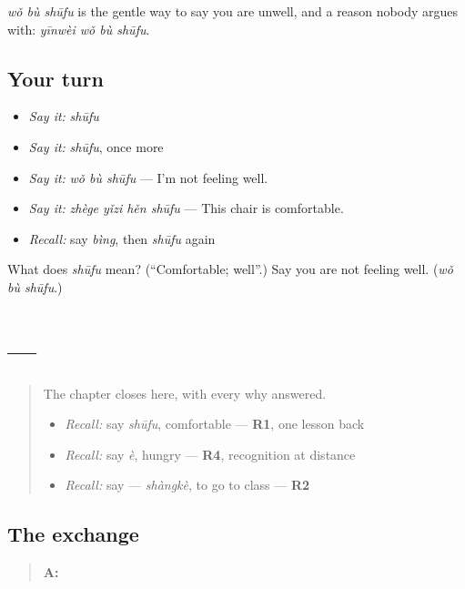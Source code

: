 \begin{grammarlens}[title={What you've built}]
\emph{wǒ bù shūfu} is the gentle way to say you are unwell, and a reason nobody argues with: \emph{yīnwèi wǒ bù shūfu}.
\end{grammarlens}

\subsection*{Your turn}
\begin{itemize}
\raggedright
  \item \emph{Say it:} \emph{shūfu}
  \item \emph{Say it:} \emph{shūfu}, once more
  \item \emph{Say it:} \emph{wǒ bù shūfu} — I'm not feeling well.
  \item \emph{Say it:} \emph{zhège yǐzi hěn shūfu} — This chair is comfortable.
  \item \emph{Recall:} say \emph{bìng}, then \emph{shūfu} again
\end{itemize}

\begin{tcolorbox}[breakable,colback=teal!4,colframe=teal!35!black,title={Before you move on}]
What does \emph{shūfu} mean? (\textquotedblleft{}Comfortable; well\textquotedblright{}.) Say you are not feeling well. (\emph{wǒ bù shūfu}.)
\end{tcolorbox}
\section[Practice]{ — }

\label{lesson:ZH-C96-practice}



\begin{quote}
The chapter closes here, with every why answered.

\begin{itemize}
\raggedright
  \item \emph{Recall:} say \emph{shūfu}, comfortable — \textbf{R1}, one lesson back
  \item \emph{Recall:} say \emph{è}, hungry — \textbf{R4}, recognition at distance
  \item \emph{Recall:} say  — \emph{shàngkè}, to go to class — \textbf{R2}
\end{itemize}
\end{quote}

\subsection*{The exchange}
\begin{quote}
\textbf{A:} 
\end{quote}

